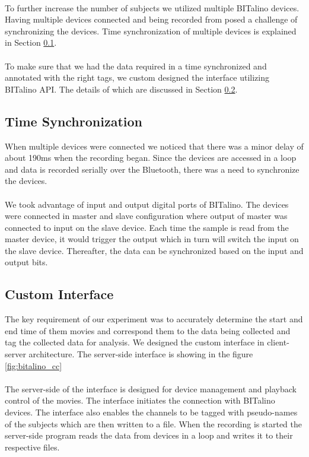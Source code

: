 \paragraph{}
To further increase the number of subjects we utilized multiple BITalino devices. Having multiple devices connected and being recorded from posed a challenge of synchronizing the devices. Time synchronization of multiple devices is explained in Section \ref{time_sync}.
\paragraph{}
To make sure that we had the data required in a time synchronized and annotated with the right tags, we custom designed the interface utilizing BITalino API. The details of which are discussed in Section \ref{custom_int}.

\subsection{Time Synchronization}
\label{time_sync}
When multiple devices were connected we noticed that there was a minor delay of about 190ms when the recording began. Since the devices are accessed in a loop and data is recorded serially over the Bluetooth, there was a need to synchronize the devices.
\paragraph{}
We took advantage of input and output digital ports of BITalino. The devices were connected in master and slave configuration where output of master was connected to input on the slave device. Each time the sample is read from the master device, it would trigger the output which in turn will switch the input on the slave device. Thereafter, the data can be synchronized based on the input and output bits.

\subsection{Custom Interface}
\label{custom_int}
The key requirement of our experiment was to accurately determine the start and end time of them movies and correspond them to the data being collected and tag the collected data for analysis. We designed the custom interface in client-server architecture. The server-side interface is showing in the figure \ref{fig:bitalino_cc}
\paragraph{}
The server-side of the interface is designed for device management and playback control of the movies. The interface initiates the connection with BITalino devices. The interface also enables the channels to be tagged with pseudo-names of the subjects which are then written to a file. When the recording is started the server-side program reads the data from devices in a loop and writes it to their respective files.
